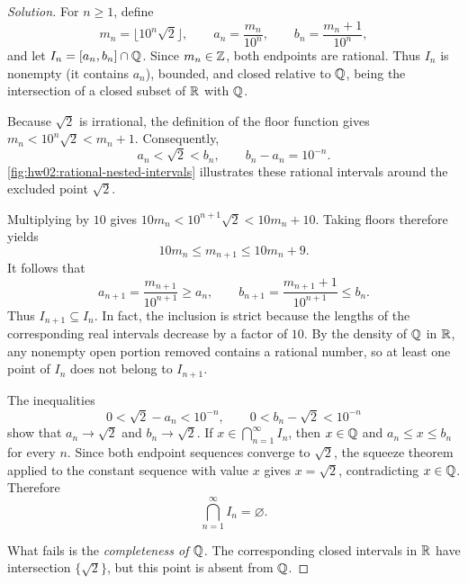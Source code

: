 
\begin{proof}[Solution]
For $n\geq1$, define
\[
  m_n=\lfloor10^n\sqrt2\rfloor,\qquad
  a_n=\frac{m_n}{10^n},\qquad b_n=\frac{m_n+1}{10^n},
\]
and let $I_n=[a_n,b_n]\cap\mathbb{Q}$. Since $m_n\in\mathbb{Z}$, both endpoints
are rational. Thus $I_n$ is nonempty (it contains $a_n$), bounded,
and closed relative to $\mathbb{Q}$, being the intersection of a closed
subset of $\mathbb{R}$ with $\mathbb{Q}$.

Because $\sqrt2$ is irrational, the definition of the floor function
gives $m_n<10^n\sqrt2<m_n+1$. Consequently,
\[
  a_n<\sqrt2<b_n,\qquad b_n-a_n=10^{-n}.
\]
\autoref{fig:hw02:rational-nested-intervals} illustrates these
rational intervals around the excluded point $\sqrt2$.
\begin{marginfigure}
  \centering
  
  \caption[Nested rational intervals.]{Schematic intervals $[a_n,b_n]\cap\Q$.
    Hollow markers indicate that $\sqrt2\notin\Q$;
    all endpoints are rational.}
  \label{fig:hw02:rational-nested-intervals}
\end{marginfigure}

Multiplying by $10$ gives $10m_n<10^{n+1}\sqrt2<10m_n+10$.
Taking floors therefore yields
\[
  10m_n\leq m_{n+1}\leq10m_n+9.
\]
It follows that
\[
  a_{n+1}=\frac{m_{n+1}}{10^{n+1}}\geq a_n,
  \qquad
  b_{n+1}=\frac{m_{n+1}+1}{10^{n+1}}\leq b_n.
\]
Thus $I_{n+1}\subseteq I_n$. In fact, the inclusion is strict because
the lengths of the corresponding real intervals decrease by a
factor of $10$. By the density of $\mathbb{Q}$ in $\mathbb{R}$, any nonempty
open portion removed contains a rational number, so at least one
point of $I_n$ does not belong to $I_{n+1}$.

The inequalities
\[
  0<\sqrt2-a_n<10^{-n},\qquad
  0<b_n-\sqrt2<10^{-n}
\]
show that $a_n\to\sqrt2$ and $b_n\to\sqrt2$. If
$x\in\bigcap_{n=1}^{\infty}I_n$, then $x\in\mathbb{Q}$ and
$a_n\leq x\leq b_n$ for every $n$. Since both endpoint sequences
converge to $\sqrt2$, the squeeze theorem applied to the constant
sequence with value $x$ gives $x=\sqrt2$, contradicting $x\in\mathbb{Q}$.
Therefore
\[
  \bigcap_{n=1}^{\infty}I_n=\varnothing.
\]

What fails is the \emph{completeness of $\mathbb{Q}$}. The corresponding
closed intervals in $\mathbb{R}$ have intersection $\{\sqrt2\}$, but this
point is absent from $\mathbb{Q}$.
\end{proof}
